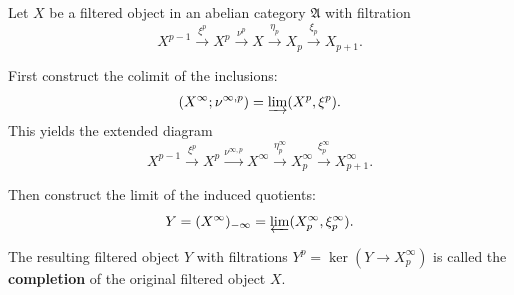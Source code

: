 Let $X$ be a filtered object in an abelian category $\mathfrak{A}$ with filtration
$$X^{p-1} \xrightarrow{\xi^p} X^p \xrightarrow{\nu^p} X \xrightarrow{\eta_p} X_p \xrightarrow{\xi_p} X_{p+1}.$$

First construct the colimit of the inclusions:
$$(X^\infty; \nu^{\infty, p}) = \varinjlim (X^p, \xi^p).$$
This yields the extended diagram
$$X^{p-1} \xrightarrow{\xi^p} X^p \xrightarrow{\nu^{\infty, p}} X^\infty \xrightarrow{\eta^\infty_p} X^\infty_p \xrightarrow{\xi^\infty_p} X^\infty_{p+1}.$$

Then construct the limit of the induced quotients:
$$Y = (X^\infty)_{-\infty} = \varprojlim (X^\infty_p, \xi^\infty_p).$$

The resulting filtered object $Y$ with filtrations $Y^p = \ker(Y \to X^\infty_p)$ is called the \textbf{completion} of the original filtered object $X$.
